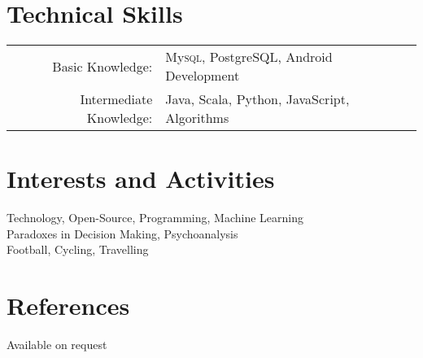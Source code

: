 \documentclass[a4paper,10pt]{article}
\begin{document}
\section{Technical Skills}
\begin{tabular}{rl}
  Basic Knowledge:& My\textsc{sql}, PostgreSQL, Android Development\\
  Intermediate Knowledge:& Java, Scala, Python, JavaScript, Algorithms
\end{tabular}

\section{Interests and Activities}
Technology, Open-Source, Programming, Machine Learning\\
Paradoxes in Decision Making, Psychoanalysis\\
Football, Cycling, Travelling

\section{References}
Available on request
\end{document}
